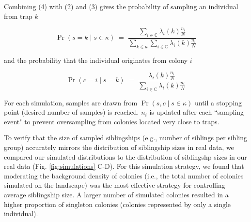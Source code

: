 \documentclass[12pt]{article}
\begin{document}
Combining (4) with (2) and (3) gives the probability of sampling an individual from trap $k$


\[
\Pr(s = k \mid s \in \kappa) \;=\; \frac{\sum_{i \in \mathbb{C}} \lambda_i(k) \frac{n_i}{N}}{\sum_{k \in \kappa} \sum_{i \in \mathbb{C}} \lambda_i(k) \frac{n_i}{N}}
\]

and the probability that the individual originates from colony $i$


\[
\Pr(c = i \mid s = k) \;=\; \frac{\lambda_i(k) \frac{n_i}{N}}{\sum_{i \in \mathbb{C}} \lambda_i(k) \frac{n_i}{N}}
\]

For each simulation, samples are drawn from $\Pr(s, c \mid s \in \kappa)$ until a stopping point (desired number of samples) is reached. $n_i$ is updated after each ``sampling event" to prevent oversampling from colonies located very close to traps.

To verify that the size of sampled siblingships (e.g., number of siblings per sibling group) accurately mirrors the distribution of siblingship sizes in real data, we compared our simulated distributions to the distribution of siblingshp sizes in our real data (Fig. \ref{fig:simulations} C-D). For this simulation strategy, we found that moderating the background density of colonies (i.e., the total number of colonies simulated on the landscape) was the most effective strategy for controlling average siblingship size. A larger number of simulated colonies resulted in a higher proportion of singleton colonies (colonies represented by only a single individual).
\end{document}

